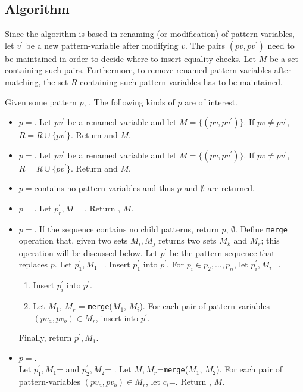 \subsection{Algorithm}
Since the algorithm is based in renaming (or modification) of pattern-variables, let $v^{\prime}$ be a new pattern-variable after modifying $v$. The pairs $(pv, pv^{\prime})$ need to be maintained in order to decide where to insert equality checks. Let $M$ be a set containing such pairs. Furthermore, to remove renamed pattern-variables after matching, the set $R$ containing such pattern-variables has to be maintained.

Given some pattern $p$, . The following kinds of $p$ are of interest.
\begin{itemize}
\item $p=$\space \BuiltInPattern. Let $pv^{\prime}$ be a renamed variable and let $M=\{(pv, pv^{\prime})\}$. If $pv \neq pv^{\prime}$, $R=R \cup \{pv^{\prime}\}$. Return \BuiltInPattern[$tag$][$pv^{\prime}$][false] and $M$.
\item $p=$\space \NonTerminal. Let $pv^{\prime}$ be a renamed variable and let $M=\{(pv, pv^{\prime})\}$. If $pv \neq pv^{\prime}$, $R=R \cup \{pv^{\prime}\}$. Return \NonTerminal[$nt$][$pv^{\prime}$][false] and $M$.
\item $p=$\space \LiteralPattern \space contains no pattern-variables and thus $p$ and $\emptyset$ are returned.
\item $p=$\space \PatternRepeat. Let $p_r^{\prime}, M =$. Return \PatternRepeat[$p_r^{\prime}$], $M$.
\item
$p=$\space \PatternSequence. If the sequence contains no child patterns, return $p$, $\emptyset$. Define \texttt{merge} operation that, given two sets $M_i, M_j$ returns two sets $M_k$ and $M_r$; this operation will be discussed below.
Let $p^{\prime}$ be the pattern sequence that replaces $p$.
Let $p_1^{\prime}, M_1$=. Insert $p_1^{\prime}$ into $p^{\prime}$. For $p_i \in p_2, ..., p_n$, let $p_i^{\prime}, M_i$=.
	\begin{enumerate}
	\item
	Insert $p_i^{\prime}$ into $p^{\prime}$.
	\item
	Let $M_1$, $M_r$ = \texttt{merge}($M_1$, $M_i$). For each pair of pattern-variables $(pv_a, pv_b) \in M_r$, insert \PatternCheckConstraint[$pv_a$][$pv_b$][false] into $p^{\prime}$.
	\end{enumerate}
Finally, return $p^{\prime}, M_1$.

\item
$p=$\space \PatternInHole.\\ Let $p_1^{\prime}, M_1$=  and $p_2^{\prime}, M_2$= . Let $M, M_r$=\texttt{merge}($M_1$, $M_2$). For each pair of pattern-variables $(pv_a, pv_b) \in M_r$, let $c_i$=\PatternCheckConstraint[$pv_a$][$pv_b$][false]. Return \PatternInHole[$p_1^{\prime}$][$p_2^{\prime}$][$c_1$][$c_n$][false], $M$.
\end{itemize}

